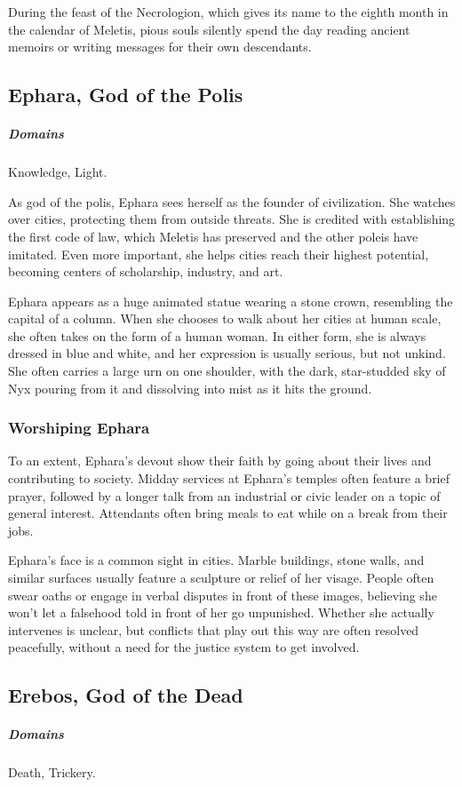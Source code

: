         During the feast of the Necrologion, which gives its name to the eighth month in the calendar of Meletis, pious souls silently spend the day reading ancient memoirs or writing messages for their own descendants.

\subsection*{Ephara, God of the Polis} \label{ssec::ephara}
    \subparagraph{Domains} Knowledge, Light.

    As god of the polis, Ephara sees herself as the founder of civilization. She watches over cities, protecting them from outside threats. She is credited with establishing the first code of law, which Meletis has preserved and the other poleis have imitated. Even more important, she helps cities reach their highest potential, becoming centers of scholarship, industry, and art.

    Ephara appears as a huge animated statue wearing a stone crown, resembling the capital of a column. When she chooses to walk about her cities at human scale, she often takes on the form of a human woman. In either form, she is always dressed in blue and white, and her expression is usually serious, but not unkind. She often carries a large urn on one shoulder, with the dark, star-studded sky of Nyx pouring from it and dissolving into mist as it hits the ground.

    \subsubsection{Worshiping Ephara}
        To an extent, Ephara's devout show their faith by going about their lives and contributing to society. Midday services at Ephara's temples often feature a brief prayer, followed by a longer talk from an industrial or civic leader on a topic of general interest. Attendants often bring meals to eat while on a break from their jobs.

        Ephara's face is a common sight in cities. Marble buildings, stone walls, and similar surfaces usually feature a sculpture or relief of her visage. People often swear oaths or engage in verbal disputes in front of these images, believing she won't let a falsehood told in front of her go unpunished. Whether she actually intervenes is unclear, but conflicts that play out this way are often resolved peacefully, without a need for the justice system to get involved.

\subsection*{Erebos, God of the Dead} \label{ssec::erebos}
    \subparagraph{Domains} Death, Trickery.


